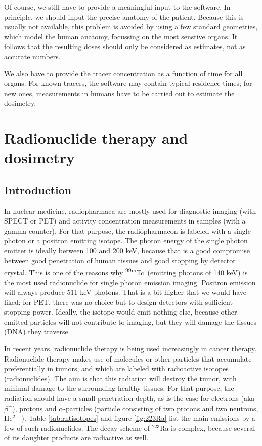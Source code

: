 \documentclass[11pt,oneside]{article}
\begin{document}
Of course, we still have to provide a meaningful input to the
software. In principle, we should input the precise anatomy of the
patient. Because this is usually not available, this problem is
avoided by using a few standard geometries, which model the human
anatomy, focussing on the most senstive organs. It follows that the
resulting doses should only be considered as estimates, not as
accurate numbers.

We also have to provide the tracer concentration as a function of time
for all organs.  For known tracers, the software may contain typical
residence times; for new ones, measurements in humans have to be
carried out to estimate the dosimetry.


\section{Radionuclide therapy and dosimetry}

\subsection{Introduction}
In nuclear medicine, radiopharmaca are mostly used for diagnostic
imaging (with SPECT or PET) and activity concentration measurements in
samples (with a gamma counter). For that purpose, the radiopharmacon is
labeled with a single photon or a positron emitting isotope. The
photon energy of the single photon emitter is ideally between 100 and
200 keV, because that is a good compromise between good penetration of
human tissues and good stopping by detector crystal. This is one of
the reasons why \textsuperscript{99m}Tc\ (emitting photons of 140 keV) is the most used
radionuclide for single photon emission imaging. Positron emission will
always produce 511 keV photons. That is a bit higher that we would
have liked; for PET, there was no choice but to design detectors with
sufficient stopping power. Ideally, the isotope would emit nothing
else, because other emitted particles will not contribute to imaging,
but they will damage the tissues (DNA) they traverse.

In recent years, radionuclide therapy is being used increasingly in
cancer therapy. Radionuclide therapy makes use of molecules or other
particles that accumulate preferentially in tumors, and which are
labeled with radioactive isotopes (radionuclides). The aim is that
this radiation will destroy the tumor, with minimal damage to the
surrounding healthy tissues. For that purpose, the radiation should
have a small penetration depth, as is the case for electrons (aka
$\beta^-$), protons and $\alpha$-particles (particle consisting of two
protons and two neutrons, He$^{2+}$). Table \ref{tab:rntisotopes} and
figure \ref{fig:223Ra} list the main emissions by a few of such
radionuclides. The decay scheme of $^{223}$Ra is complex, because several
of its daughter products are radiactive as well.
\end{document}
